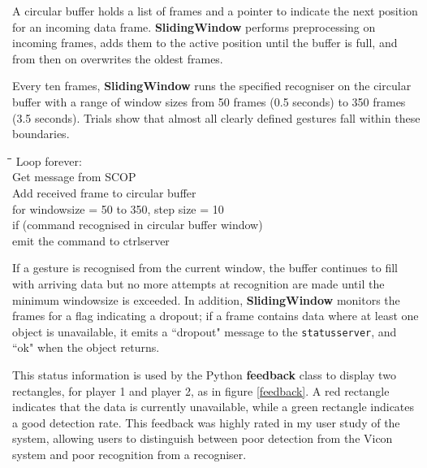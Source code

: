 \documentclass[12pt,a4,notitlepage]{report}
\renewcommand{\_}{\texttt{\symbol{95}}}
\newcommand{\<}{\texttt{\symbol{60}}}
\renewcommand{\>}{\texttt{\symbol{62}}}
\newcommand{\class}[1]{\textbf{#1}}
\newcommand{\variable}[1]{\texttt{#1}}
\newenvironment{pseudocode}{\begin{slshape}\begin{tabbing}\hspace*{0.5cm}\=\hspace*{0.5cm}\=\hspace*{0.5cm}\= \kill }{\end{tabbing}\end{slshape}}
\begin{document}
A circular buffer holds a list of frames and a pointer to indicate the next position for an incoming data frame. \class{SlidingWindow} performs preprocessing on  incoming frames, adds them to the active position until the buffer is full, and from then on overwrites the oldest frames.

Every ten frames, \class{SlidingWindow} runs the specified recogniser on the circular buffer with a range of window sizes from 50 frames (0.5 seconds) to 350 frames (3.5 seconds). Trials show that almost all clearly defined gestures fall within these boundaries.

\begin{pseudocode}
Loop forever: \\
\>	Get message from SCOP \\
\>	Add received frame to circular buffer \\
\>\>    for windowsize = 50 to 350, step size = 10 \\
\>\>        if (command recognised in circular buffer window) \\
\>\>\>           emit the command to ctrlserver
\end{pseudocode}

If a gesture is recognised from the current window, the buffer continues to fill with arriving data but no more attempts at recognition are made until the minimum windowsize is exceeded. In addition, \class{SlidingWindow} monitors the frames for a flag indicating a dropout; if a frame contains data where at least one object is unavailable, it emits a ``dropout" message to the \variable{statusserver}, and ``ok" when the object returns.

This status information is used by the Python \class{feedback} class to display two rectangles, for player 1 and player 2, as in figure \ref{feedback}. A red rectangle indicates that the data is currently unavailable, while a green rectangle indicates a good detection rate. This feedback was highly rated in my user study of the system, allowing users to distinguish between poor detection from the Vicon system and poor recognition from a recogniser.
\end{document}
